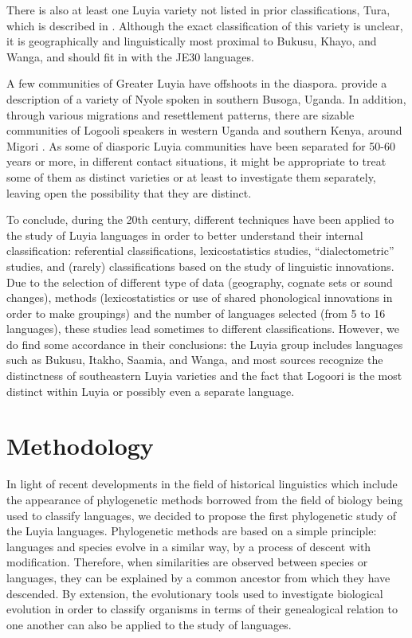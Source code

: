 \documentclass[output=paper]{langscibook}
\begin{document}
There is also at least one Luyia variety not listed in prior classifications, Tura, which is described in \citet{marlo_tura_2008}. Although the exact classification of this variety is unclear, it is geographically and linguistically most proximal to Bukusu, Khayo, and Wanga, and should fit in with the JE30 languages. 

A few communities of Greater Luyia have offshoots in the diaspora. \citet{marlo_sketch_2017} provide a description of a variety of Nyole spoken in southern Busoga, Uganda. In addition, through various migrations and resettlement patterns, there are sizable communities of Logooli speakers in western Uganda and southern Kenya, around Migori \citep[70]{chavasu_british_1997,heine_language_1980}. As some of diasporic Luyia communities have been separated for 50-60 years or more, in different contact situations, it might be appropriate to treat some of them as distinct varieties or at least to investigate them separately, leaving open the possibility that they are distinct.

\begin{sloppypar}
To conclude, during the 20th century, different techniques have been applied to the study of Luyia languages in order to better understand their internal classification: referential classifications, lexicostatistics studies, “dialectometric” studies, and (rarely) classifications based on the study of linguistic innovations. Due to the selection of different type of data (geography, cognate sets or sound changes), methods (lexicostatistics or use of shared phonological innovations in order to make groupings) and the number of languages selected (from 5 to 16 languages), these studies lead sometimes to different classifications. However, we do find some accordance in their conclusions: the Luyia group includes languages such as Bukusu, Itakho, Saamia, and Wanga, and most sources recognize the distinctness of southeastern Luyia varieties and the fact that Logoori is the most distinct within Luyia or possibly even a separate language.
\end{sloppypar}

\section{Methodology}
\label{sec:3:Methodology}

In light of recent developments in the field of historical linguistics which include the appearance of phylogenetic methods borrowed from the field of biology being used to classify languages, we decided to propose the first phylogenetic study of the Luyia languages. Phylogenetic methods are based on a simple principle: languages and species evolve in a similar way, by a process of descent with modification. Therefore, when similarities are observed between species or languages, they can be explained by a common ancestor from which they have descended. By extension, the evolutionary tools used to investigate biological evolution in order to classify organisms in terms of their genealogical relation to one another can also be applied to the study of languages.
\end{document}
